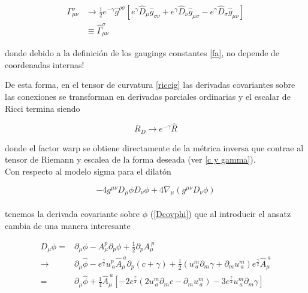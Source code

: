 \documentclass{article}
\numberwithin{equation}{section}
\begin{document}
\begin{equation}\label{gammahat}
\begin{aligned}
\Gamma^{\sigma}_{\mu \nu} &\longrightarrow \frac{1}{2} e^{-\gamma}\hat{g}^{\rho \sigma}\left[ e^{\gamma}\hat{D}_{\mu} \hat{g}_{\sigma \nu} + e^{\gamma}\hat{D}_{\nu} \hat{g}_{\mu \sigma} - e^{\gamma}\hat{D}_{\sigma} \hat{g}_{\mu \nu}\right]\\
&\equiv \hat{\Gamma}^{\sigma}_{\mu \nu}
\end{aligned} 
\end{equation}

donde debido a la definición de los gaugings constantes \ref{fa}, no depende de coordenadas internas!

De esta forma, en el tensor de curvatura \ref{riccig} las derivadas covariantes sobre las conexiones se transforman en derivadas parciales ordinarias y el escalar de Ricci termina siendo

\begin{boxquation}
	\begin{equation}
	R_D \longrightarrow e^{- \gamma} \hat{R}
	\end{equation}
\end{boxquation}

donde el factor warp se obtiene directamente de la métrica inversa que contrae al tensor de Riemann y escalea de la forma deseada (ver \ref{c y gamma}).\\

Con respecto al modelo sigma para el dilatón

\begin{equation}
-4g^{\mu \nu} D_{\mu} \phi D_{\nu} \phi + 4 \nabla_{\mu} \left(g^{\mu \nu} D_{\nu} \phi\right)
\end{equation}\\

tenemos la derivada covariante sobre $ \phi $ (\ref{Dcovphi}) que al introducir el ansatz cambia de una manera interesante

\begin{equation}
\begin{aligned}
D_{\mu} \phi =& \partial_{\mu} \phi - A_{\mu}^p \partial_p \phi + \frac{1}{2} \partial_p A_{\mu}^{\ p}\\
\longrightarrow& \partial_{\mu} \hat{\phi} - e^{\frac{\gamma}{2}} u^{p}_{\ a} \hat{A}_{\mu}^{\ a} \partial_{p}(c + \gamma) + \frac{1}{2} \left( u^{m}_{\ a} \partial_m \gamma + \partial_m u^{m}_{\ a}\right) e^{\frac{\gamma}{2}} \hat{A}_{\mu}^{\ a}\\
=& \partial_{\mu} \hat{\phi} + \frac{1}{4} \hat{A}_{\mu}^{\ a} \left[ -2e^{\frac{\gamma}{2}} \left( 2u^{m}_{\ a} \partial_{m}c - \partial_m u^{m}_{\ a} \right) -3 e^{\frac{\gamma}{2}} u^{m}_{\ a} \partial_m \gamma\right]
\end{aligned}
\end{equation}
\end{document}
